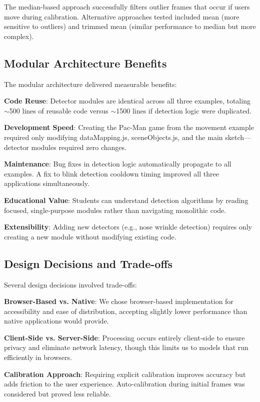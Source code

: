\documentclass[sigconf]{acmart}
\begin{document}
The median-based approach successfully filters outlier frames that occur if users move during calibration. Alternative approaches tested included mean (more sensitive to outliers) and trimmed mean (similar performance to median but more complex).

\subsection{Modular Architecture Benefits}

The modular architecture delivered measurable benefits:

\textbf{Code Reuse}: Detector modules are identical across all three examples, totaling $\sim$500 lines of reusable code versus $\sim$1500 lines if detection logic were duplicated.

\textbf{Development Speed}: Creating the Pac-Man game from the movement example required only modifying dataMapping.js, sceneObjects.js, and the main sketch---detector modules required zero changes.

\textbf{Maintenance}: Bug fixes in detection logic automatically propagate to all examples. A fix to blink detection cooldown timing improved all three applications simultaneously.

\textbf{Educational Value}: Students can understand detection algorithms by reading focused, single-purpose modules rather than navigating monolithic code.

\textbf{Extensibility}: Adding new detectors (e.g., nose wrinkle detection) requires only creating a new module without modifying existing code.

\subsection{Design Decisions and Trade-offs}

Several design decisions involved trade-offs:

\textbf{Browser-Based vs. Native}: We chose browser-based implementation for accessibility and ease of distribution, accepting slightly lower performance than native applications would provide.

\textbf{Client-Side vs. Server-Side}: Processing occurs entirely client-side to ensure privacy and eliminate network latency, though this limits us to models that run efficiently in browsers.

\textbf{Calibration Approach}: Requiring explicit calibration improves accuracy but adds friction to the user experience. Auto-calibration during initial frames was considered but proved less reliable.
\end{document}
